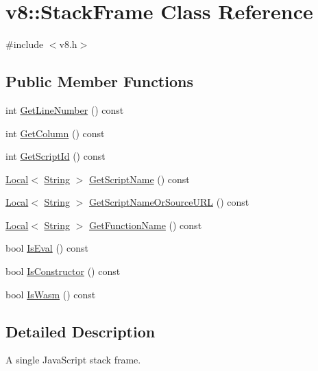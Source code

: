 \hypertarget{classv8_1_1StackFrame}{}\section{v8\+:\+:Stack\+Frame Class Reference}
\label{classv8_1_1StackFrame}


{\ttfamily \#include $<$v8.\+h$>$}

\subsection*{Public Member Functions}
\begin{DoxyCompactItemize}
\item 
int \mbox{\hyperlink{classv8_1_1StackFrame_a34ab9f48a06525cd9f93e01a70427ca2}{Get\+Line\+Number}} () const
\item 
int \mbox{\hyperlink{classv8_1_1StackFrame_a3b4d7d29ae82b88304d09ea5c5e43db1}{Get\+Column}} () const
\item 
int \mbox{\hyperlink{classv8_1_1StackFrame_ac2f0f26b9c7aee860cdd613c0d83ae35}{Get\+Script\+Id}} () const
\item 
\mbox{\hyperlink{classv8_1_1Local}{Local}}$<$ \mbox{\hyperlink{classv8_1_1String}{String}} $>$ \mbox{\hyperlink{classv8_1_1StackFrame_a2885f14557e14c64396206b0f79daa3e}{Get\+Script\+Name}} () const
\item 
\mbox{\hyperlink{classv8_1_1Local}{Local}}$<$ \mbox{\hyperlink{classv8_1_1String}{String}} $>$ \mbox{\hyperlink{classv8_1_1StackFrame_a4fbd286090b13661b3db148e0a3779b5}{Get\+Script\+Name\+Or\+Source\+U\+RL}} () const
\item 
\mbox{\hyperlink{classv8_1_1Local}{Local}}$<$ \mbox{\hyperlink{classv8_1_1String}{String}} $>$ \mbox{\hyperlink{classv8_1_1StackFrame_a9cd783598db74ab35bd4ae7c8cbc374f}{Get\+Function\+Name}} () const
\item 
bool \mbox{\hyperlink{classv8_1_1StackFrame_aa07e67a6a00adcd0f5c8c4ba7a82e54a}{Is\+Eval}} () const
\item 
bool \mbox{\hyperlink{classv8_1_1StackFrame_a8f37df38214b6dc10655fc50f0341eb8}{Is\+Constructor}} () const
\item 
bool \mbox{\hyperlink{classv8_1_1StackFrame_aec6d28360828b8cadc3da6a5dbd83d89}{Is\+Wasm}} () const
\end{DoxyCompactItemize}


\subsection{Detailed Description}
A single Java\+Script stack frame. 

